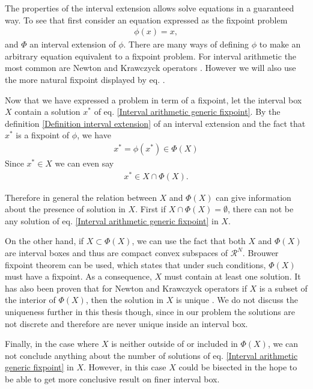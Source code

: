 \documentclass[
11pt, %
english, %
singlespacing, %
nolistspacing, %
liststotoc, %
headsepline, %
]{MastersDoctoralThesis} %
\begin{document}
The properties of the interval extension allows solve equations in a guaranteed way. To see that first consider an equation expressed as the fixpoint problem
\begin{align}
	\phi(x) = x,  \label{Interval arithmetic generic fixpoint}
\end{align}
and $\Phi$ an interval extension of $\phi$. There are many ways of defining $\phi$ to make an arbitrary equation equivalent to a fixpoint problem. For interval arithmetic the most common are Newton and Krawczyck  operators \cite{moore2009introduction, tucker2011validated}. However we will also use the more natural fixpoint displayed by eq. .

Now that we have expressed a problem in term of a fixpoint, let the interval box $X$ contain a solution $x^*$ of eq. \eqref{Interval arithmetic generic fixpoint}. By the definition \ref{Definition interval extension} of an interval extension and the fact that $x^*$ is a fixpoint of $\phi$, we have
\begin{align}
	x^* = \phi(x^*) \in \Phi(X)
\end{align}
Since $x^* \in X$ we can even say
\begin{align}
	x^* \in X \cap \Phi(X).  \label{Generic solution refinement}
\end{align}

Therefore in general the relation between $X$ and $\Phi(X)$ can give information about the presence of solution in $X$. First if $X \cap \Phi(X) = \emptyset$, there can not be any solution of eq. \eqref{Interval arithmetic generic fixpoint} in $X$.

On the other hand, if $X \subset \Phi(X)$, we can use the fact that both $X$ and $\Phi(X)$ are interval boxes and thus are compact convex subspaces of $\mathcal{R}^N$. Brouwer fixpoint theorem can be used, which states that under such conditions, $\Phi(X)$ must have a fixpoint. As a consequence, $X$ must contain at least one solution. It has also been proven that for Newton and Krawczyck operators if $X$ is a subset of the interior of $\Phi(X)$, then the solution in $X$ is unique \cite{moore2009introduction, tucker2011validated}. We do not discuss the uniqueness further in this thesis though, since in our problem the solutions are not discrete and therefore are never unique inside an interval box.

Finally, in the case where $X$ is neither outside of or included in $\Phi(X)$, we can not conclude anything about the number of solutions of eq. \eqref{Interval arithmetic generic fixpoint} in $X$. However, in this case $X$ could be bisected in the hope to be able to get more conclusive result on finer interval box.
\end{document}
